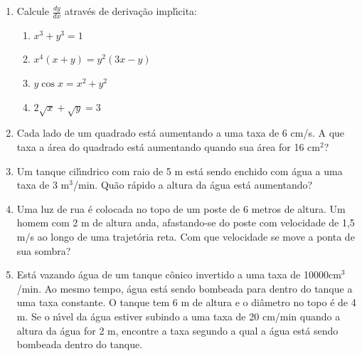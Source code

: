 \documentclass[a4paper,5pt]{amsbook}
\newcommand{\ds}{\displaystyle}
\begin{document}
\vspace{1cm}
\begin{enumerate}
    \vspace{0.5cm}
    \item Calcule $\ds\frac{dy}{dx}$ atrav\'es de deriva\c{c}\~ao impl\'{\i}cita:
        \begin{enumerate}
            \vspace{0.3cm}
            \item $x^3+y^3=1$
            \vspace{0.3cm}
            \item $x^4(x+y)=y^2(3x-y)$
            \vspace{0.3cm}
            \item $y\cos{x}=x^2+y^2$
            \vspace{0.3cm}
            \item $2\sqrt{x} + \sqrt{y}=3$
        \end{enumerate}

    \vspace{0.5cm}
    \item Cada lado de um quadrado est\'a aumentando a uma taxa de 6 cm/s. A
        que taxa a \'area do quadrado est\'a aumentando quando sua \'area for 16
        cm$^2$?

    \vspace{0.5cm}
    \item Um tanque cil\'{\i}ndrico com raio de 5 m est\'a sendo enchido com \'agua a
        uma taxa de 3 m$^3$/min. Qu\~ao r\'apido a altura da \'agua est\'a
        aumentando?

    \vspace{0.5cm}
    \item Uma luz de rua \'e colocada no topo de um poste de 6 metros de
        altura. Um homem com 2 m de altura anda, afastando-se do poste com
        velocidade de 1,5 m/s ao longo de uma trajet\'oria reta. Com que
        velocidade se move a ponta de sua sombra? 

    \vspace{0.5cm}
    \item Est\'a vazando \'agua de um tanque c\^onico invertido a uma taxa de
        10000cm$^3$/min. Ao mesmo tempo, \'agua est\'a sendo bombeada para dentro do
        tanque a uma taxa constante. O tanque tem 6 m de altura e o di\^ametro
        no topo \'e de 4 m. Se o n\'{\i}vel da \'agua estiver subindo a uma taxa de 20
        cm/min quando a altura da \'agua for 2 m, encontre a taxa segundo a
        qual a \'agua est\'a sendo bombeada dentro do tanque.


\end{enumerate}
\end{document}
